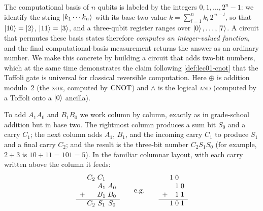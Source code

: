 The computational basis of $n$ qubits is labeled by the integers
$0,1,\dots,2^{n}-1$: we identify the string $\ket{k_1\cdots k_n}$ with its
base-two value $k=\sum_{l=1}^{n}k_l\,2^{\,n-l}$, so that $\ket{10}=\ket{2}$,
$\ket{11}=\ket{3}$, and a three-qubit register ranges over $\ket{0},\dots,\ket{7}$.
A circuit that permutes these basis states therefore \emph{computes an
integer-valued function}, and the final computational-basis measurement returns
the answer as an ordinary number. We make this concrete by building a circuit
that adds two-bit numbers, which at the same time demonstrates the claim
following \cref{def:lec01-cnot} that the Toffoli gate is universal for classical
reversible computation. Here $\oplus$ is addition modulo~$2$ (the \textsc{xor},
computed by $\mathrm{CNOT}$) and $\wedge$ is the logical \textsc{and} (computed by a
Toffoli onto a $\ket{0}$ ancilla).

To add $A_1A_0$ and $B_1B_0$ we work column by column, exactly as in grade-school
addition but in base two. The rightmost column produces a sum bit $S_0$ and a
carry $C_1$; the next column adds $A_1$, $B_1$, and the incoming carry $C_1$ to
produce $S_1$ and a final carry $C_2$; and the result is the three-bit number
$C_2S_1S_0$ (for example, $2+3$ is $10+11=101=5$). In the familiar columnar layout,
with each carry written above the column it feeds:
\[
\begin{array}{r@{\;}c@{\;}c@{\;}c}
    & C_2 & C_1 &     \\
    &     & A_1 & A_0 \\
  + &     & B_1 & B_0 \\ \hline
    & C_2 & S_1 & S_0
\end{array}
\qquad\text{e.g.}\qquad
\begin{array}{r@{\;}c@{\;}c@{\;}c}
    & 1 & 0 &   \\
    &   & 1 & 0 \\
  + &   & 1 & 1 \\ \hline
    & 1 & 0 & 1
\end{array}
\]

